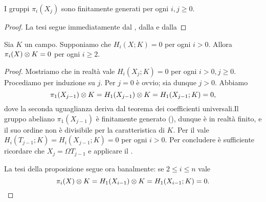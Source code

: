 \begin{corollary}
I gruppi $\pi_i(X_j)$ sono finitamente generati per ogni $i,j\ge 0$.
\end{corollary}
\begin{proof}
La tesi segue immediatamente dal , dalla  e dalla 
\end{proof}

\begin{proposition}
Sia $K$ un campo. Supponiamo che $H_i(X;K)=0$ per ogni $i>0$. Allora $\pi_i(X)\mathbin{\otimes} K=0$ per ogni $i\ge 2$.
\end{proposition}
\begin{proof}
Mostriamo che in realtà vale $H_i(X_j;K)=0$ per ogni $i>0,j\ge 0$. Procediamo per induzione su $j$. Per $j=0$ è ovvio; sia dunque $j>0$. Abbiamo
$$
\pi_1(X_{j-1})\mathbin{\otimes} K=H_1(X_{j-1})\mathbin{\otimes} K=H_1(X_{j-1};K)=0,
$$
dove la seconda uguaglianza deriva dal teorema dei coefficienti universali.Il gruppo abeliano $\pi_1(X_{j-1})$ è finitamente generato (), dunque è in realtà finito, e il suo ordine non è divisibile per la caratteristica di $K$. Per il  vale $H_i(T_{j-1};K)=H_i(X_{j-1};K)=0$ per ogni $i>0$. Per concludere è sufficiente ricordare che $X_j=\Omega T_{j-1}$ e applicare il .

La tesi della proposizione segue ora banalmente: se $2\le i\le n$ vale
$$
\pi_i(X)\mathbin{\otimes} K=H_1(X_{i-1})\mathbin{\otimes} K=H_1(X_{i-1};K)=0.
$$
\end{proof}

